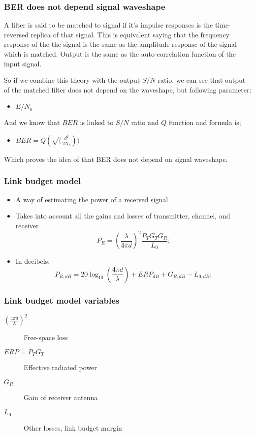 \documentclass{beamer}
\begin{document}
\begin{frame}
	\frametitle{BER does not depend signal waveshape}
A filter is said to be matched to signal if it's impulse responses is the time-reversed replica of that signal. This is equivalent saying that the frequency response of the the signal is the same as the amplitude response of the signal which is matched. Output is the same as the auto-correlation function of the input signal.

So if we combine this theory with the output $S/N$ ratio, we can see that output of the matched filter does not depend on the waveshape, but following parameter:
\begin{itemize}
	\item $E/N_o$
\end{itemize} 

And we know that $BER$ is linked to $S/N$ ratio and $Q$ function and formula is;
\begin{itemize}
	\item $BER= Q(\sqrt(\frac{d^2}{2 N_o }))$
\end{itemize}

Which proves the idea of that BER does not depend on signal waveshape.
\end{frame}

\begin{frame}
	\frametitle{Link budget model}
	\begin{itemize}
		\item A way of estimating the power of a received signal
		\item Takes into account all the gains and losses of transmitter, channel, and receiver
		\begin{equation}
			P_R = \left(\frac{\lambda}{4 \pi d}\right)^2 \frac{P_T G_T G_R}{L_0};
		\end{equation}
		\item In decibels:
		\begin{equation}
			P_{R, dB} = 20\log_{10}\left(\frac{4 \pi d}{\lambda}\right) + {ERP}_{dB} + G_{R, dB} - L_{0, dB};
		\end{equation}
	\end{itemize}
\end{frame}

\begin{frame}
	\frametitle{Link budget model variables}
	\begin{description}
		\item[$(\frac{4 \pi d}{\lambda})^2$] Free-space loss
		\item[$ERP = P_T G_T$] Effective radiated power
		\item[$G_R$] Gain of receiver antenna
		\item[$L_0$] Other losses, link budget margin
	\end{description}
\end{frame}
\end{document}
